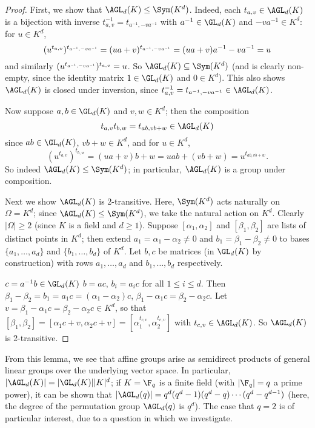 \begin{proof}
    First, we show that $\AGL_d(K) \leq \Sym(K^d)$. Indeed, each $t_{a,v} \in \AGL_d(K)$ is a bijection with inverse $t_{a,v}^{-1} = t_{a^{-1},-va^{-1}}$ with $a^{-1} \in \GL_d(K)$ and $-va^{-1} \in K^d$: for $u \in K^d$,
    $$(u^{t_{a,v}})^{t_{a^{\scaleto{-1}{3pt}},-va^{\scaleto{-1}{3pt}}}} = (ua + v)^{t_{a^{\scaleto{-1}{3pt}},-va^{\scaleto{-1}{3pt}}}} = (ua + v)a^{-1} - va^{-1} = u$$
    and similarly $(u^{t_{a^{\scaleto{-1}{3pt}},-va^{\scaleto{-1}{3pt}}}})^{t_{a,v}} = u$. So $\AGL_d(K) \subseteq \Sym(K^d)$ (and is clearly non-empty, since the identity matrix $1 \in \GL_d(K)$ and $0 \in K^d$). This also shows $\AGL_d(K)$ is closed under inversion, since $t_{a,v}^{-1} = t_{a^{-1},-va^{-1}} \in \AGL_d(K)$.

    Now suppose $a,b \in \GL_d(K)$ and $v,w \in K^d$; then the composition
    $$t_{a,v}t_{b,w} = t_{ab,vb+w} \in \AGL_d(K)$$
    since $ab \in \GL_d(K)$, $vb + w \in K^d$, and for $u \in K^d$,
    $$(u^{t_{a,v}})^{t_{b,w}} = (ua + v)b + w = uab + (vb + w) = u^{t_{ab,vb+w}}.$$
    So indeed $\AGL_d(K) \leq \Sym(K^d)$; in particular, $\AGL_d(K)$ is a group under composition.

    Next we show $\AGL_d(K)$ is 2-transitive. Here, $\Sym(K^d)$ acts naturally on $\Omega = K^d$; since $\AGL_d(K) \leq \Sym(K^d)$, we take the natural action on $K^d$. Clearly $|\Omega| \geq 2$ (since $K$ is a field and $d \geq 1$). Suppose $[\alpha_1,\alpha_2]$ and $[\beta_1,\beta_2]$ are lists of distinct points in $K^d$; then extend $a_1 = \alpha_1 - \alpha_2 \neq 0$ and $b_1 = \beta_1 - \beta_2 \neq 0$ to bases $\{a_1,\dotsc,a_d\}$ and $\{b_1,\dotsc,b_d\}$ of $K^d$. Let $b,c$ be matrices (in $\GL_d(K)$ by construction) with rows $a_1,\dotsc,a_d$ and $b_1,\dotsc,b_d$ respectively.

     $c = a^{-1}b \in \GL_d(K)$  $b = ac$,  $b_i = a_ic$ for all $1 \leq i \leq d$. Then $\beta_1 - \beta_2 = b_1 = a_1c = (\alpha_1 - \alpha_2)c$,  $\beta_1 - \alpha_1 c = \beta_2 - \alpha_2 c$. Let $v = \beta_1 - \alpha_1c = \beta_2 - \alpha_2c \in K^d$, so that $[\beta_1,\beta_2] = [\alpha_1c + v,\alpha_2c + v] = [\alpha_1^{t_{c,v}},\alpha_2^{t_{c,v}}]$ with $t_{c,v} \in \AGL_d(K)$. So $\AGL_d(K)$ is 2-transitive.
\end{proof}

From this lemma, we see that affine groups arise as semidirect products of general linear groups over the underlying vector space. In particular, $|\AGL_d(K)| = |\GL_d(K)||K|^d$; if $K = \F_q$ is a finite field (with $|\F_q| = q$ a prime power), it can be shown that $|\AGL_d(q)| = q^d(q^d - 1)(q^d - q)\dotsb(q^d - q^{d-1})$ (here, the degree of the permutation group $\AGL_d(q)$ is $q^d$). The case that $q = 2$ is of particular interest, due to a question in \cite{moscatiello_roney-dougal2021} which we investigate.

